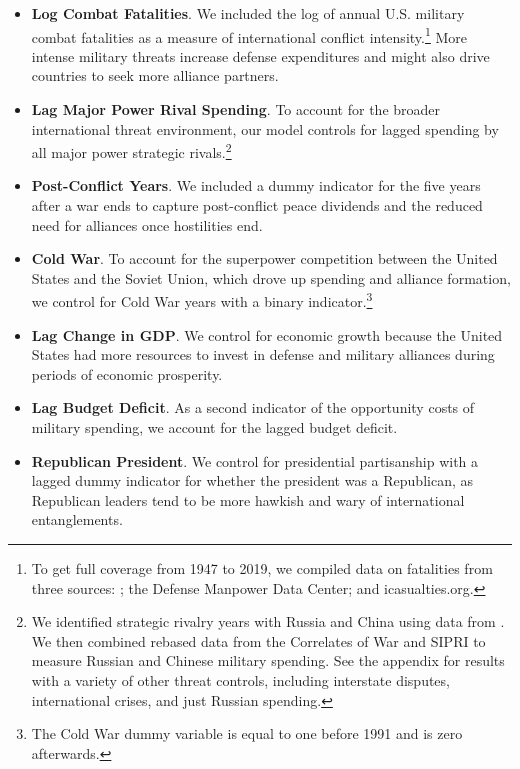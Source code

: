 \documentclass[12pt,hidelinks]{article}
\begin{document}
\begin{itemize}

\item \textbf{Log Combat Fatalities}. We included the log of annual U.S. military combat fatalities as a measure of international conflict intensity.\footnote{To get full coverage from 1947 to 2019, we compiled data on fatalities from three sources: \cite{mintzpolitical92}; the Defense Manpower Data Center; and icasualties.org.} More intense military threats increase defense expenditures and might also drive countries to seek more alliance partners. 

\item \textbf{Lag Major Power Rival Spending}. To account for the broader international threat environment, our model controls for lagged spending by all major power strategic rivals.\footnote{We identified strategic rivalry years with Russia and China using data from \cite{ThompsonDreyer2012}. We then combined rebased data from the Correlates of War and SIPRI to measure Russian and Chinese military spending. See the appendix for results with a variety of other threat controls, including interstate disputes, international crises, and just Russian spending.}

\item \textbf{Post-Conflict Years}. We included a dummy indicator for the five years after a war ends to capture post-conflict peace dividends and the reduced need for alliances once hostilities end.  

\item \textbf{Cold War}. To account for the superpower competition between the United States and the Soviet Union, which drove up spending and alliance formation, we control for Cold War years with a binary indicator.\footnote{The Cold War dummy variable is equal to one before 1991 and is zero afterwards.}



\item \textbf{Lag Change in GDP}. We control for economic growth because the United States had more resources to invest in defense and military alliances during periods of economic prosperity.

\item \textbf{Lag Budget Deficit}. As a second indicator of the opportunity costs of military spending, we account for the lagged budget deficit. 

\item \textbf{Republican President}. We control for presidential partisanship with a lagged dummy indicator for whether the president was a Republican, as Republican leaders tend to be more hawkish and wary of international entanglements.

\end{itemize}
  
\end{document}
